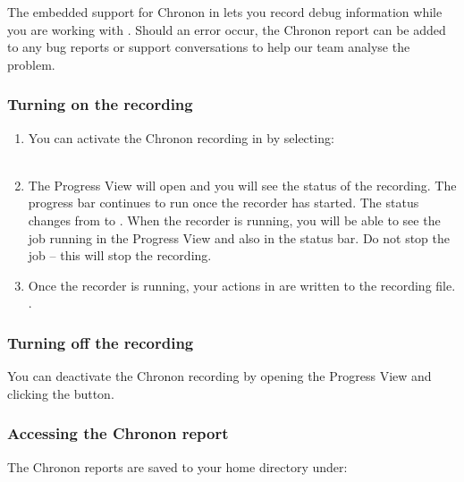 The embedded support for Chronon in \app{} lets you record debug information while you are working with \app{}. Should an error occur, the Chronon report can be added to any bug reports or support conversations to help our team analyse the problem. 

\subsubsection{Turning on the recording}
\begin{enumerate}
\item You can activate the Chronon recording in \app{} by selecting:\\
\\
\item The Progress View will open and you will see the status of the recording. The progress bar continues to run once the recorder has started. The status changes from  to . When the recorder is running, you will be able to see the job running in the Progress View and also in the status bar. Do not stop the job -- this will stop the recording. 
\item Once the recorder is running, your actions in \app{} are written to the recording file.
. 
\end{enumerate}

 
\subsubsection{Turning off the recording}
You can deactivate the Chronon recording by opening the Progress View and clicking the  button. 

\subsubsection{Accessing the Chronon report}
The Chronon reports are saved to your home directory under:\\
\\

